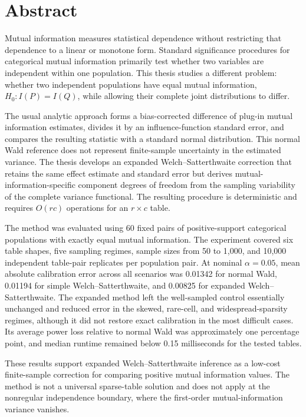 \chapter*{Abstract}

Mutual information measures statistical dependence without restricting that
dependence to a linear or monotone form. Standard significance procedures for
categorical mutual information primarily test whether two variables are
independent within one population. This thesis studies a different problem:
whether two independent populations have equal mutual information,
\(H_0:I(P)=I(Q)\), while allowing their complete joint distributions to differ.

The usual analytic approach forms a bias-corrected difference of plug-in
mutual information estimates, divides it by an influence-function standard
error, and compares the resulting statistic with a standard normal
distribution. This normal Wald reference does not represent finite-sample
uncertainty in the estimated variance. The thesis develops an expanded
Welch--Satterthwaite correction that retains the same effect estimate and
standard error but derives mutual-information-specific component degrees of
freedom from the sampling variability of the complete variance functional.
The resulting procedure is deterministic and requires \(O(rc)\) operations
for an \(r\times c\) table.

The method was evaluated using 60 fixed pairs of positive-support categorical
populations with exactly equal mutual information. The experiment covered six
table shapes, five sampling regimes, sample sizes from 50 to 1,000, and 10,000
independent table-pair replicates per population pair. At nominal
\(\alpha=0.05\), mean absolute calibration error across all scenarios was
0.01342 for normal Wald, 0.01194 for simple Welch--Satterthwaite, and 0.00825
for expanded Welch--Satterthwaite. The expanded method left the well-sampled
control essentially unchanged and reduced error in the skewed, rare-cell, and
widespread-sparsity regimes, although it did not restore exact calibration in
the most difficult cases. Its average power loss relative to normal Wald was
approximately one percentage point, and median runtime remained below
0.15 milliseconds for the tested tables.

These results support expanded Welch--Satterthwaite inference as a low-cost
finite-sample correction for comparing positive mutual information values.
The method is not a universal sparse-table solution and does not apply at the
nonregular independence boundary, where the first-order mutual-information
variance vanishes.
